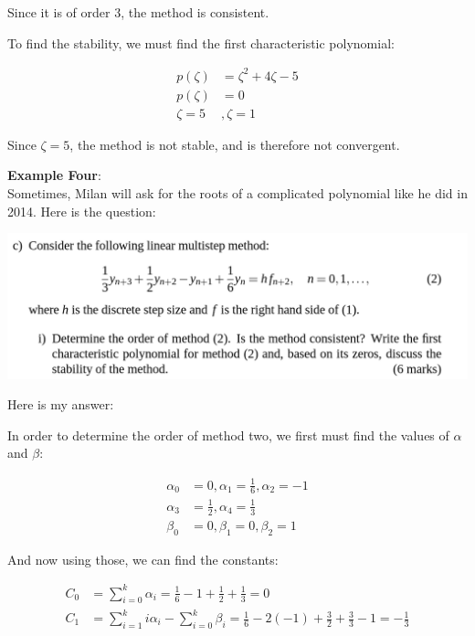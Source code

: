 \begin{description}
Since it is of order $3$, the method is consistent.

To find the stability, we must find the first characteristic
polynomial:

\[
\begin{split}
  p(\zeta) &= \zeta^2 + 4\zeta - 5\\
  p(\zeta) &= 0\\
  \zeta = 5&, \zeta = 1
\end{split}
\]

Since $\zeta = 5$, the method is not stable, and is therefore not
convergent.
\item \textbf{Example Four}:\\
  Sometimes, Milan will ask for the roots of a complicated polynomial
  like he did in 2014. Here is the question:

  \begin{center}
    \includegraphics[width=\textwidth]{images/2014q}
  \end{center}

  Here is my answer:

  In order to determine the order of method two, we first must find the
  values of $\alpha$ and $\beta$:

    \[
      \begin{split}
        \alpha_0 &= 0, \alpha_1 = \frac{1}{6}, \alpha_2 = -1\\
        \alpha_3 &= \frac{1}{2}, \alpha_4 = \frac{1}{3}\\
        \beta_0 &= 0, \beta_1 = 0, \beta_2 = 1
      \end{split}
    \]

  And now using those, we can find the constants:

      \[
      \begin{split}
        C_0 &= \sum\limits^k_{i=0}\alpha_i = \frac{1}{6} - 1 +
        \frac{1}{2} + \frac{1}{3} = 0\\
        C_1 &= \sum\limits^k_{i=1}i\alpha_i -
        \sum\limits^k_{i=0}\beta_i = \frac{1}{6} - 2(-1) + \frac{3}{2}
        + \frac{3}{3} - 1 = -\frac{1}{3}
      \end{split}
      \]


\end{description}
